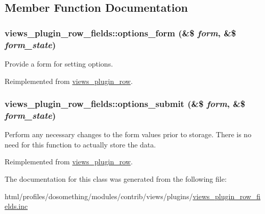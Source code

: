 \subsection{Member Function Documentation}
\hypertarget{classviews__plugin__row__fields_abb87b6c98697fb676638759cb95072e3}{
\subsubsection[{options\_\-form}]{\setlength{\rightskip}{0pt plus 5cm}views\_\-plugin\_\-row\_\-fields::options\_\-form (\&\$ {\em form}, \/  \&\$ {\em form\_\-state})}}
\label{classviews__plugin__row__fields_abb87b6c98697fb676638759cb95072e3}
Provide a form for setting options. 

Reimplemented from \hyperlink{classviews__plugin__row_a6914c39d64977a0aa71da39cc1af004e}{views\_\-plugin\_\-row}.\hypertarget{classviews__plugin__row__fields_ab9bddfa302a7098aad70693840bbbb6e}{
\subsubsection[{options\_\-submit}]{\setlength{\rightskip}{0pt plus 5cm}views\_\-plugin\_\-row\_\-fields::options\_\-submit (\&\$ {\em form}, \/  \&\$ {\em form\_\-state})}}
\label{classviews__plugin__row__fields_ab9bddfa302a7098aad70693840bbbb6e}
Perform any necessary changes to the form values prior to storage. There is no need for this function to actually store the data. 

Reimplemented from \hyperlink{classviews__plugin__row_adce2d15d7f422a48477c6fdf43de80ee}{views\_\-plugin\_\-row}.

The documentation for this class was generated from the following file:\begin{DoxyCompactItemize}
\item 
html/profiles/dosomething/modules/contrib/views/plugins/\hyperlink{views__plugin__row__fields_8inc}{views\_\-plugin\_\-row\_\-fields.inc}\end{DoxyCompactItemize}
